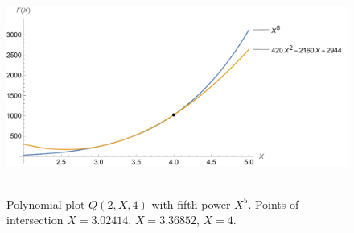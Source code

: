 ﻿\begin{figure}[H]
    \centering
    \includegraphics[width=1\textwidth]{sections/images/04_plots_polynomial_q2_n4_with_fifth}
    ~\caption{Polynomial plot $Q(2, X, 4)$ with fifth power $X^5$.
    Points of intersection $X=3.02414$, $X=3.36852$, $X=4$.}\label{fig:figure10}
\end{figure}
